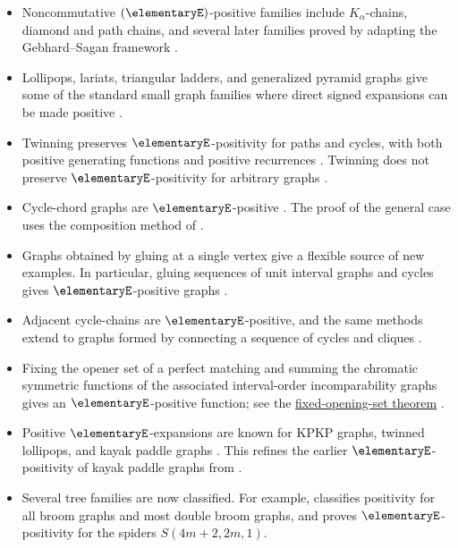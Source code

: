 \begin{itemize}
\item
Noncommutative $(\elementaryE)$-positive families include $K_\alpha$-chains,
diamond and path chains, and several later families proved by adapting the
Gebhard--Sagan framework \cite{GebhardSagan2001,WangWang2022,WangZhou2024x}.

\item
Lollipops, lariats, triangular ladders, and generalized pyramid graphs give
some of the standard small graph families where direct signed expansions can
be made positive \cite{Dahlberg2018x,DahlbergWilligenburg2018,LiYang2021}.

\item
Twinning preserves $\elementaryE$-positivity for paths and cycles, with both
positive generating functions and positive recurrences
\cite{BanaianCelanoChangLeeColmenarejoGoffKimbleKimpelLentferLiangSundaram2025}.
Twinning does not preserve $\elementaryE$-positivity for arbitrary graphs
\cite{LiLiWangYang2021}.

\item
Cycle-chord graphs are $\elementaryE$-positive
\cite{WangWang2022,Wang2025}.  The proof of the general case uses the
composition method of \cite{WangZhou2024x}.

\item
Graphs obtained by gluing at a single vertex give a flexible source of
new examples.  In particular, gluing sequences of unit interval graphs and
cycles gives $\elementaryE$-positive graphs \cite{TomVailaya2025x}.

\item
Adjacent cycle-chains are $\elementaryE$-positive, and the same methods
extend to graphs formed by connecting a sequence of cycles and cliques
\cite{TomVailayaAdjacent2026}.

\item
Fixing the opener set of a perfect matching and summing the chromatic
symmetric functions of the associated interval-order incomparability graphs
gives an $\elementaryE$-positive function; see the
\hyperref[fixedOpeningMatchingPositivity]{fixed-opening-set theorem}
\cite{Chae2026Opening}.

\item
Positive $\elementaryE$-expansions are known for KPKP graphs, twinned
lollipops, and kayak paddle graphs \cite{TangWang2024x}.  This refines the
earlier $\elementaryE$-positivity of kayak paddle graphs from
\cite{AliniaeifardWangWilligenburg2024}.

\item
Several tree families are now classified. For example, \cite{WangWang2023}
classifies positivity for all broom graphs and most double broom graphs,
and \cite{TangWangWang2024x} proves $\elementaryE$-positivity for the
spiders $S(4m+2,2m,1)$.
\end{itemize}



